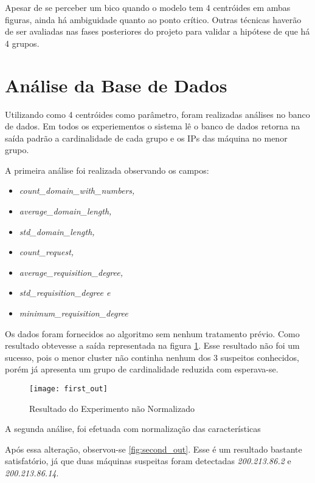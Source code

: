 Apesar de se perceber um bico quando o modelo tem 4 centróides em ambas figuras, ainda há ambiguidade quanto ao ponto crítico. Outras técnicas haverão de ser avaliadas nas fases posteriores do projeto para validar a hipótese de que há 4 grupos.

\section{Análise da Base de Dados}

Utilizando como 4 centróides como parâmetro, foram realizadas análises no banco de dados. Em todos os experiementos o sistema lê o banco de dados retorna na saída padrão a cardinalidade de cada grupo e os IPs das máquina no menor grupo.

A primeira análise foi realizada observando os campos:

\begin{itemize}
\item \textit{count\_domain\_with\_numbers, }
\item \textit{average\_domain\_length, }
\item \textit{std\_domain\_length, }
\item \textit{count\_request, }
\item \textit{average\_requisition\_degree, }
\item \textit{std\_requisition\_degree e }
\item \textit{minimum\_requisition\_degree }
\end{itemize}

Os dados foram fornecidos ao algoritmo sem nenhum tratamento prévio. Como resultado obtevesse a saída representada na figura \ref{fig:first_out}. Esse resultado não foi um sucesso, pois o menor cluster não continha nenhum dos 3 suspeitos conhecidos, porém já apresenta um grupo de cardinalidade reduzida com esperava-se.

\begin{figure}[htbp]
\centering
\texttt{[image: first\_out]}
\caption[Resultado do Experimento não Normalizado]{Resultado do Experimento não Normalizado} \label{fig:first_out}
\end{figure}

A segunda análise, foi efetuada com normalização das características

Após essa alteração, observou-se \ref{fig:second_out}. Esse é um resultado bastante satisfatório, já que duas máquinas suspeitas foram detectadas \textit{200.213.86.2} e \textit{200.213.86.14}.

